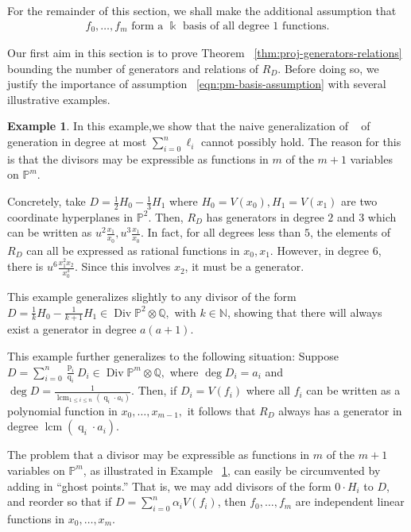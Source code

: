 \documentclass{amsart}
\theoremstyle{plain}
\theoremstyle{definition}
\newtheorem{example}[thm]{Example}
\theoremstyle{remark}
\numberwithin{equation}{section}
\newcommand\bn{{\mathbb N}}
\newcommand\bq{{\mathbb Q}}
\newcommand\bp{{\mathbb P}}
\newcommand\bk{{\Bbbk}}
\DeclareMathOperator\di{Div}
\newcommand\bida{a}
\DeclareMathOperator{\num}{p}
\DeclareMathOperator{\den}{q}
\DeclareMathOperator{\lcm}{lcm}
\begin{document}
For the remainder of this section, we shall make the additional assumption that 
\begin{align}
\label{eqn:pm-basis-assumption}
	f_0, \ldots, f_{m} \text{ form a } \bk \text{ basis of all degree 1 functions.}
\end{align}

Our first aim in this section is to prove Theorem
~\ref{thm:proj-generators-relations} bounding the number of generators and
relations of $R_D$. Before doing so, we justify the importance of assumption
~\eqref{eqn:pm-basis-assumption} with several illustrative examples.

\begin{example}
\label{eg:hyperplane}
In this example,we show that the naive generalization of
~\cite[Theorem 8]{dorney:canonical} of generation in degree at most
$\sum_{i=0}^{n}\ell_i$ cannot possibly hold. The reason for this is
that the divisors may be
expressible as functions in $m$ of the $m+1$ variables on $\bp^m$.

Concretely, take $D = \frac{1}{2}H_0 - \frac{1}{3}H_1$ where $H_0 = V(x_0),
H_1 = V(x_1)$ are two coordinate hyperplanes in $\bp^2$. Then, $R_D$
has generators in degree $2$ and $3$ which can be written as $u^2
\frac{x_1}{x_0}, u^3 \frac{x_1}{x_0}.$ In fact, for all degrees
less than $5$, the elements of $R_D$ can all be expressed as
rational functions in $x_0, x_1$. However, in degree $6$, there is
$u^6 \frac{x_1^2 x_2}{x_0^3}$. Since this
involves $x_2$, it must be a generator.

This example generalizes slightly to any divisor of the form $D =
\frac{1}{k}H_0 - \frac{1}{k+1}H_1 \in \di \bp^2 \otimes \bq,$ with
$k \in \bn$, showing that there will always exist a generator in
degree $a(a + 1)$.

This example further generalizes to the following situation:
Suppose $D = \sum_{i=0}^{n} \frac{\num_i}{\den_i}D_i \in \di \bp^m
\otimes \bq,$ where $\deg D_i = \bida_i$ and $\deg D = \frac{1}{\lcm
_{1 \leq i \leq n}(\den_i \cdot \bida_i)}$. Then, if $D_i = V(f_i)$
where all $f_i$ can be written as a polynomial function in $x_0,
\ldots, x_{m-1},$ it follows that $R_D$ always has a generator in degree
$\lcm(\den_i \cdot \bida_i)$.
\end{example}

The problem that a divisor may be
expressible as functions in $m$ of the $m+1$ variables on $\bp^m$, 
as illustrated in Example ~\ref{eg:hyperplane}, can easily be circumvented by adding in ``ghost
points.'' That is, we may add divisors of the form $0 \cdot H_i$ to
$D$, and reorder so that if $D = \sum_{i=0}^{n}\alpha_i V(f_i)$,
then $f_0, \ldots, f_m$ are independent linear functions in
$x_0,\ldots, x_m$.
\end{document}
